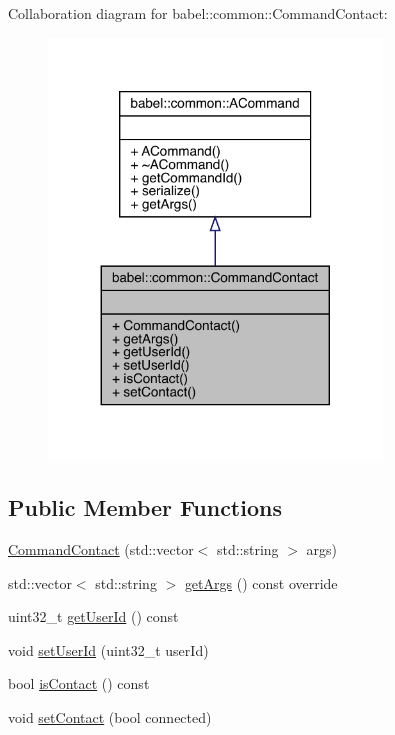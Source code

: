 Collaboration diagram for babel\+:\+:common\+:\+:Command\+Contact\+:\nopagebreak
\begin{figure}[H]
\begin{center}
\leavevmode
\includegraphics[width=251pt]{classbabel_1_1common_1_1_command_contact__coll__graph}
\end{center}
\end{figure}
\subsection*{Public Member Functions}
\begin{DoxyCompactItemize}
\item 
\mbox{\hyperlink{classbabel_1_1common_1_1_command_contact_ae66f5c49e02e93bd2d8683fc35aad63d}{Command\+Contact}} (std\+::vector$<$ std\+::string $>$ args)
\item 
std\+::vector$<$ std\+::string $>$ \mbox{\hyperlink{classbabel_1_1common_1_1_command_contact_a660c56eaf8a3ec532ba18e11292554df}{get\+Args}} () const override
\item 
uint32\+\_\+t \mbox{\hyperlink{classbabel_1_1common_1_1_command_contact_a9e3eda57d790bdf8c6fa6cfb4b2950c7}{get\+User\+Id}} () const
\item 
void \mbox{\hyperlink{classbabel_1_1common_1_1_command_contact_ab3ee4ea19427d59a9a601523131a7dc4}{set\+User\+Id}} (uint32\+\_\+t user\+Id)
\item 
bool \mbox{\hyperlink{classbabel_1_1common_1_1_command_contact_a9fe0ea681c9e92a5494cf7790a487e68}{is\+Contact}} () const
\item 
void \mbox{\hyperlink{classbabel_1_1common_1_1_command_contact_a4bfe715388879b4f8b4674619385c2cd}{set\+Contact}} (bool connected)
\end{DoxyCompactItemize}


